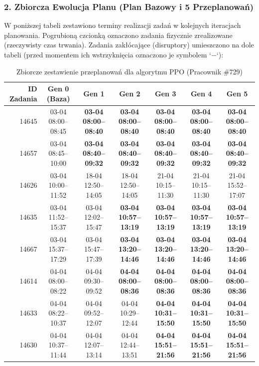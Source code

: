 \subsubsection*{2. Zbiorcza Ewolucja Planu (Plan Bazowy i 5 Przeplanowań)}

W poniższej tabeli zestawiono terminy realizacji zadań w kolejnych iteracjach planowania. Pogrubioną czcionką oznaczono zadania fizycznie zrealizowane (rzeczywisty czas trwania). Zadania zakłócające (disruptory) umieszczono na dole tabeli (przed momentem ich wstrzyknięcia oznaczono je symbolem `$-$`):

\begin{table}[htbp]
\centering\scriptsize
\caption{Zbiorcze zestawienie przeplanowań dla algorytmu PPO (Pracownik \#729)}
\label{tab:case_study_evolution_ppo_u729}
\begin{tabular}{|r|c|c|c|c|c|c|}
\hline
\textbf{ID Zadania} & \textbf{Gen 0 (Baza)} & \textbf{Gen 1} & \textbf{Gen 2} & \textbf{Gen 3} & \textbf{Gen 4} & \textbf{Gen 5} \\ \hline
14645 & 03-04 08:00--08:45 & \textbf{03-04 08:00--08:40} & \textbf{03-04 08:00--08:40} & \textbf{03-04 08:00--08:40} & \textbf{03-04 08:00--08:40} & \textbf{03-04 08:00--08:40} \\ 
14657 & 03-04 08:45--10:00 & \textbf{03-04 08:40--09:32} & \textbf{03-04 08:40--09:32} & \textbf{03-04 08:40--09:32} & \textbf{03-04 08:40--09:32} & \textbf{03-04 08:40--09:32} \\ 
14626 & 03-04 10:00--11:52 & 18-04 12:50--14:05 & 18-04 12:50--14:05 & 21-04 10:15--11:30 & 21-04 10:15--11:30 & 21-04 15:52--17:07 \\ 
14635 & 03-04 11:52--15:37 & 03-04 12:02--15:47 & \textbf{03-04 10:57--13:19} & \textbf{03-04 10:57--13:19} & \textbf{03-04 10:57--13:19} & \textbf{03-04 10:57--13:19} \\ 
14667 & 03-04 15:37--17:29 & 03-04 15:47--17:39 & \textbf{03-04 13:20--14:46} & \textbf{03-04 13:20--14:46} & \textbf{03-04 13:20--14:46} & \textbf{03-04 13:20--14:46} \\ 
14614 & 04-04 08:00--08:22 & 04-04 09:30--09:52 & \textbf{04-04 08:00--08:36} & \textbf{04-04 08:00--08:36} & \textbf{04-04 08:00--08:36} & \textbf{04-04 08:00--08:36} \\ 
14633 & 04-04 08:22--10:37 & 04-04 09:52--12:07 & 04-04 10:29--12:44 & \textbf{04-04 10:31--15:50} & \textbf{04-04 10:31--15:50} & \textbf{04-04 10:31--15:50} \\ 
14630 & 04-04 10:37--11:44 & 04-04 12:07--13:14 & 04-04 12:44--13:51 & \textbf{04-04 15:51--21:56} & \textbf{04-04 15:51--21:56} & \textbf{04-04 15:51--21:56} \\ 

\end{tabular}
\end{table}
